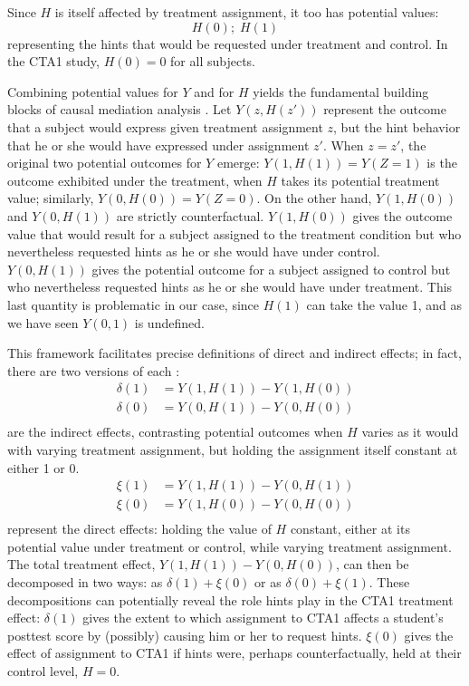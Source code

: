 \documentclass{article}\usepackage[]{graphicx}\usepackage[]{color}
\begin{document}
Since $H$ is itself affected by treatment assignment, it
too has potential values:
\begin{equation*}
H(0);\;H(1)
\end{equation*}
representing the hints that would be requested under treatment and
control.
In the CTA1 study, $H(0)=0$ for all subjects.

Combining potential values for $Y$ and for $H$ yields the fundamental
building blocks of causal mediation analysis
\citep[e.g.][]{vanderweele2015explanation,sales2017mediation}.
Let $Y(z,H(z'))$
represent the outcome that a subject would express given treatment
assignment $z$, but the hint behavior that he or she would have
expressed under assignment $z'$.
When $z=z'$, the original two potential outcomes for $Y$ emerge:
$Y(1,H(1))=Y(Z=1)$ is the outcome exhibited under the treatment, when $H$
takes its potential treatment value; similarly, $Y(0,H(0))=Y(Z=0)$. On
the other hand, $Y(1,H(0))$ and $Y(0,H(1))$ are strictly
counterfactual. $Y(1,H(0))$ gives the outcome value
that would result for a subject assigned to the treatment condition
but who nevertheless requested hints as he or she would have under
control. $Y(0,H(1))$ gives the potential outcome for a subject
assigned to control but who nevertheless requested hints as he or she
would have under treatment.
This last quantity is problematic in our case, since $H(1)$ can take the value 1,
and as we have seen $Y(0,1)$ is undefined.

This framework facilitates precise definitions of direct and indirect
effects; in fact, there are two versions of each \cite[e.g.][]{imai2011unpacking}:
\begin{align*}
\delta(1)&=Y(1,H(1))-Y(1,H(0))\\
\delta(0)&=Y(0,H(1))-Y(0,H(0))\\
\end{align*}
are the indirect effects, contrasting potential outcomes when $H$
varies as it would with varying treatment assignment, but holding the
assignment itself constant at either 1 or 0.
\begin{align*}
\xi(1)&=Y(1,H(1))-Y(0,H(1))\\
\xi(0)&=Y(1,H(0))-Y(0,H(0))\\
\end{align*}
represent the direct effects: holding the value of $H$ constant,
either at its potential value under treatment or control, while
varying treatment assignment.
The total treatment effect, $Y(1,H(1))-Y(0,H(0))$, can then be
decomposed in two ways: as $\delta(1)+\xi(0)$ or as
$\delta(0)+\xi(1)$.
These decompositions can potentially reveal the role hints play in the
CTA1 treatment effect: $\delta(1)$ gives the extent to which
assignment to CTA1 affects a student's posttest score by (possibly)
causing him or her to request hints.
$\xi(0)$ gives the effect of assignment to CTA1 if hints were,
perhaps counterfactually, held at their control level, $H=0$.
\end{document}
